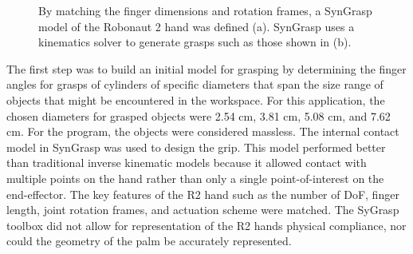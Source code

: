 \documentclass[runningheads,a4paper]{llncs}
\begin{document}
\begin{figure}[t]%
\centering
\null\hfill
	\hfill
	\hfill\null

\caption{By matching the finger dimensions and rotation frames, a SynGrasp model of the Robonaut 2 hand was defined (a). SynGrasp uses a kinematics solver to generate grasps such as those shown in (b). }%
\label{fig:models}%
\end{figure} 

The first step was to build an initial model for grasping by determining the finger angles for grasps of cylinders of specific diameters that span the size range of objects that might be encountered in the workspace. For this application, the chosen diameters for grasped objects were 2.54 cm, 3.81 cm, 5.08 cm, and 7.62 cm. For the program, the objects were considered massless. The internal contact model in SynGrasp was used to design the grip. This model performed better than traditional inverse kinematic models because it allowed contact with multiple points on the hand rather than only a single point-of-interest on the end-effector. The key features of the R2 hand such as the number of  DoF, finger length, joint rotation frames, and actuation scheme were matched. The SyGrasp toolbox did not allow for representation of the R2 hands physical compliance, nor could the geometry of the palm be accurately represented. 
\end{document}
